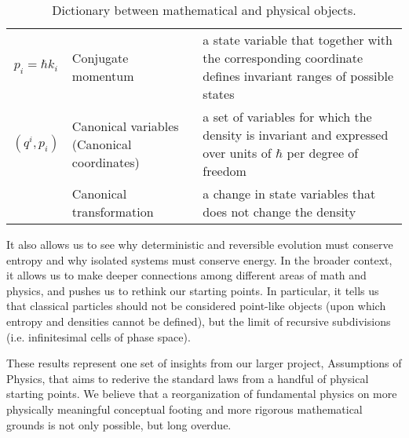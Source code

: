 \documentclass[11pt]{article}
\begin{document}
\begin{table}[h]
\begin{tabular}{c p{} p{} }
		$p_i=\hbar k_i$ & Conjugate momentum & a state variable that together with the corresponding coordinate defines invariant ranges of possible states \\
		$(q^i, p_i)$ & Canonical variables \newline (Canonical coordinates) & a set of variables for which the density is invariant and expressed over units of $\hbar$ per degree of freedom\\ 
		& Canonical transformation & a change in state variables that does not change the density\\ 
	\end{tabular}
	\caption{Dictionary between mathematical and physical objects.}
	\label{dictionary}
\end{table}
It also allows us to see why deterministic and reversible evolution must conserve entropy and why isolated systems must conserve energy. In the broader context, it allows us to make deeper connections among different areas of math and physics, and pushes us to rethink our starting points. In particular, it tells us that classical particles should not be considered point-like objects (upon which entropy and densities cannot be defined), but the limit of recursive subdivisions (i.e. infinitesimal cells of phase space).

These results represent one set of insights from our larger project, Assumptions of Physics, that aims to rederive the standard laws from a handful of physical starting points. We believe that a reorganization of fundamental physics on more physically meaningful conceptual footing and more rigorous mathematical grounds is not only possible, but long overdue.
\end{document}
